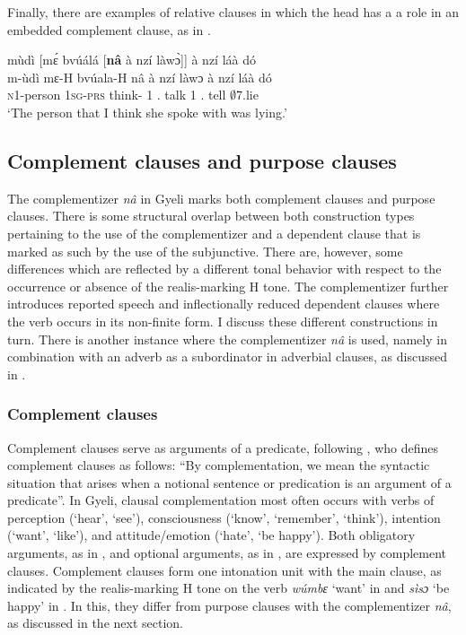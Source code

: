 Finally, there are examples of relative clauses in which the head has a a role in an embedded complement clause, as in .


\ea\label{CREL3} 
  \glll mùdì [mɛ́ bvúálá [{\bfseries nâ} à nzí làwɔ̀]\textsubscript{{\COMP}}]\textsubscript{{\REL}} à nzí láà dó \\
        m-ùdì {\db}mɛ-H bvúala-H {\db}nâ à nzí làwɔ à nzí láà dó \\
       \textsc{n}1-person {\db}1\textsc{sg}-\textsc{prs} think-{\R} {\db}{\COMP} 1 {\PROG}.{\PST} talk 1 {\PROG}.{\PST} tell $\emptyset$7.lie  \\
    \trans `The person that I think she spoke with was lying.'
\z













\subsection{Complement clauses and purpose clauses}
\label{sec:Compna}

The complementizer {\itshape nâ} in Gyeli marks both complement clauses and purpose clauses. There is some structural overlap between both construction types pertaining to the use of the complementizer and a dependent clause that is marked as such by the use of the subjunctive. There are, however, some differences which are reflected by a different tonal behavior with respect to the occurrence or absence of the realis-marking H tone. The complementizer further introduces reported speech and inflectionally reduced dependent clauses where the verb occurs in its non-finite form. I discuss these different constructions in turn. There is another instance where the complementizer {\itshape nâ} is used, namely in combination with an adverb as a subordinator in adverbial clauses, as discussed in .  

\subsubsection{Complement clauses}
\label{sec:CompC}

Complement clauses serve as arguments of a predicate, following \citet[52]{noonan2007}, who defines complement clauses as follows:
``By complementation, we mean the syntactic situation that arises when a notional sentence or predication is an argument of a predicate''. 
In Gyeli, clausal complementation most often occurs with verbs of perception (`hear', `see'), consciousness (`know', `remember', `think'), intention (`want', `like'), and attitude/emotion (`hate', `be happy'). 
Both obligatory arguments, as in , and optional arguments, as in , are expressed by complement clauses. Complement clauses form one intonation unit with the main clause, as indicated by the realis-marking H tone on the verb {\itshape wúmbɛ} `want' in  and {\itshape sìsɔ} `be happy' in . In this, they differ from purpose clauses with the complementizer {\itshape nâ}, as discussed in the next section.


